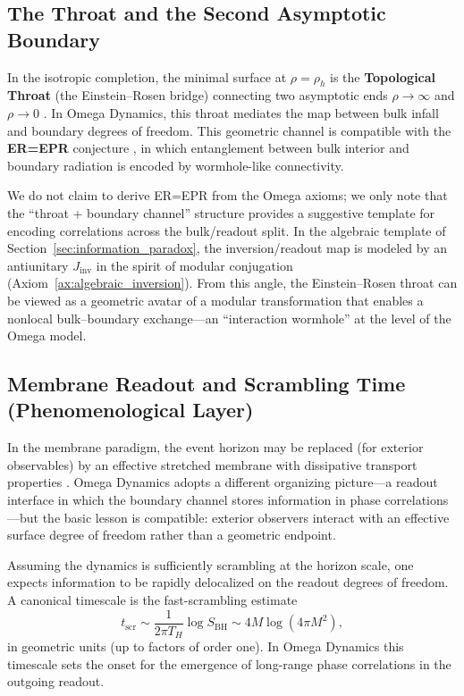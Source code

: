 \subsection{The Throat and the Second Asymptotic Boundary}
In the isotropic completion, the minimal surface at $\rho=\rho_h$ is the \textbf{Topological Throat} (the Einstein--Rosen bridge) connecting two asymptotic ends $\rho\to\infty$ and $\rho\to 0$ \cite{EinsteinRosen1935, Kruskal1960}. In Omega Dynamics, this throat mediates the map between bulk infall and boundary degrees of freedom. This geometric channel is compatible with the \textbf{ER=EPR} conjecture \cite{SusskindMaldacena2013}, in which entanglement between bulk interior and boundary radiation is encoded by wormhole-like connectivity.
\begin{remark}
We do not claim to derive ER=EPR from the Omega axioms; we only note that the ``throat + boundary channel'' structure provides a suggestive template for encoding correlations across the bulk/readout split. In the algebraic template of Section~\ref{sec:information_paradox}, the inversion/readout map is modeled by an antiunitary $J_{\mathrm{inv}}$ in the spirit of modular conjugation (Axiom~\ref{ax:algebraic_inversion}). From this angle, the Einstein--Rosen throat can be viewed as a geometric avatar of a modular transformation that enables a nonlocal bulk--boundary exchange---an ``interaction wormhole'' at the level of the Omega model.
\end{remark}

\subsection{Membrane Readout and Scrambling Time (Phenomenological Layer)}
In the membrane paradigm, the event horizon may be replaced (for exterior observables) by an effective stretched membrane with dissipative transport properties \cite{ThornePrice1986}. Omega Dynamics adopts a different organizing picture---a readout interface in which the boundary channel stores information in phase correlations---but the basic lesson is compatible: exterior observers interact with an effective surface degree of freedom rather than a geometric endpoint.
\par
Assuming the dynamics is sufficiently scrambling at the horizon scale, one expects information to be rapidly delocalized on the readout degrees of freedom. A canonical timescale is the fast-scrambling estimate \cite{SekinoSusskind2008, HaydenPreskill2007}
\begin{equation}
  t_{\mathrm{scr}}
  \sim \frac{1}{2\pi T_H}\log S_{\mathrm{BH}}
  \sim 4M\log(4\pi M^2),
\end{equation}
in geometric units (up to factors of order one). In Omega Dynamics this timescale sets the onset for the emergence of long-range phase correlations in the outgoing readout.
